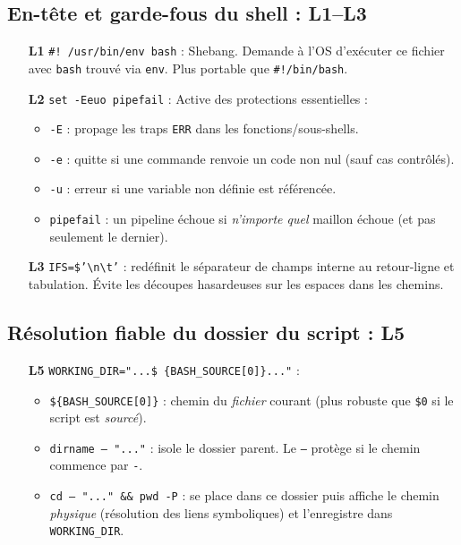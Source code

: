 \documentclass[11pt,a4paper]{article}
\begin{document}
\subsection*{En-tête et garde-fous du shell : L1--L3}
\begin{enumerate}
  \item[\textbf{L1}] \texttt{\#! /usr/bin/env bash} : Shebang. Demande à l'OS d'exécuter ce fichier avec \texttt{bash} trouvé via \texttt{env}. Plus portable que \texttt{\#!/bin/bash}.
  \item[\textbf{L2}] \texttt{set -Eeuo pipefail} : Active des protections essentielles :
  \begin{itemize}
    \item \texttt{-E} : propage les traps \texttt{ERR} dans les fonctions/sous-shells.
    \item \texttt{-e} : quitte si une commande renvoie un code non nul (sauf cas contrôlés).
    \item \texttt{-u} : erreur si une variable non définie est référencée.
    \item \texttt{pipefail} : un pipeline échoue si \emph{n'importe quel} maillon échoue (et pas seulement le dernier).
  \end{itemize}
  \item[\textbf{L3}] \texttt{IFS=\$'\textbackslash n\textbackslash t'} : redéfinit le séparateur de champs interne au retour-ligne et tabulation. Évite les découpes hasardeuses sur les espaces dans les chemins.
\end{enumerate}

\subsection*{Résolution fiable du dossier du script : L5}
\begin{enumerate}
  \item[\textbf{L5}] \texttt{WORKING\_DIR="...\$ \{BASH\_SOURCE[0]\}..."} :
  \begin{itemize}
    \item \texttt{\$\{BASH\_SOURCE[0]\}} : chemin du \emph{fichier} courant (plus robuste que \texttt{\$0} si le script est \emph{sourcé}).
    \item \texttt{dirname -- "..."} : isole le dossier parent. Le \texttt{--} protège si le chemin commence par \texttt{-}.
    \item \texttt{cd -- "..."\ \&\&\ pwd -P} : se place dans ce dossier puis affiche le chemin \emph{physique} (résolution des liens symboliques) et l'enregistre dans \texttt{WORKING\_DIR}.
  \end{itemize}
\end{enumerate}
\end{document}
